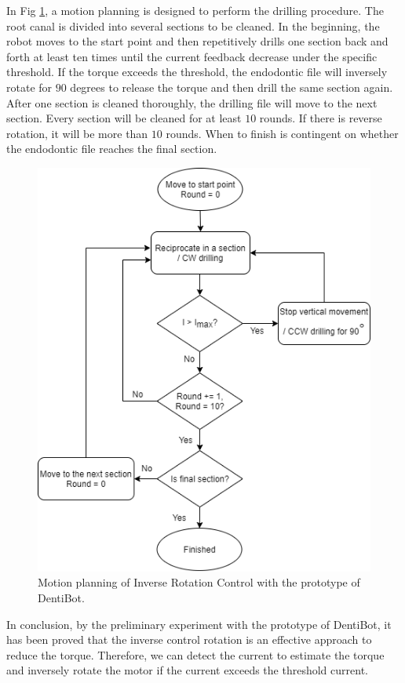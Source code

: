 \par
In Fig \ref{fig: inverse_rotation}, a motion planning is designed to perform the drilling procedure. The root canal is divided into several sections to be cleaned. In the beginning, the robot moves to the start point and then repetitively drills one section back and forth at least ten times until the current feedback decrease under the specific threshold. If the torque exceeds the threshold, the endodontic file will inversely rotate for $90$ degrees to release the torque and then drill the same section again. After one section is cleaned thoroughly, the drilling file will move to the next section. Every section will be cleaned for at least $10$ rounds. If there is reverse rotation, it will be more than $10$ rounds. When to finish is contingent on whether the endodontic file reaches the final section.
\begin{figure}[htbp]
\begin{center}
\includegraphics[width=0.8\linewidth]{Images/inverse_rotation.png}
\caption{Motion planning of Inverse Rotation Control with the prototype of DentiBot.}
\label{fig: inverse_rotation} 
\end{center}
\end{figure}
\par
In conclusion, by the preliminary experiment with the prototype of DentiBot, it has been proved that the inverse control rotation is an effective approach to reduce the torque. Therefore, we can detect the current to estimate the torque and inversely rotate the motor if the current exceeds the threshold current. 
